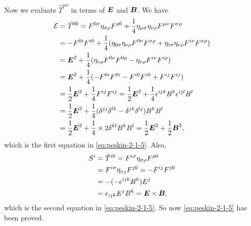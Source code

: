 \documentclass[hyperref, a4paper]{article}
\begin{document}
\begin{itemize}
    Now we evaluate $\hat{T}^{\mu \nu}$ in terms of $\vb*{E}$ and $\vb*{B}$.
    We have
    \[
        \begin{aligned}
            \mathcal{E} &= \hat{T}^{00} = F^{0 \sigma} \eta_{\sigma \rho} F^{\rho 0} + \frac{1}{4} \eta_{\mu \sigma} \eta_{\nu \rho} F^{\mu \nu} F^{\sigma \rho} \\
            &= - F^{0 i} F^{i 0} + \frac{1}{4} (\eta_{0 \sigma} \eta_{\nu \rho} F^{0 \nu} F^{\sigma \rho} + \eta_{i \sigma} \eta_{\nu \rho} F^{i \nu} F^{\sigma \rho}) \\
            &= \vb*{E}^2 + \frac{1}{4} ( \eta_{\nu \rho} F^{0 \nu} F^{0 \rho} - \eta_{\nu \rho} F^{i \nu} F^{i \rho}) \\
            &= \vb*{E}^2 + \frac{1}{4} ( - F^{0 i} F^{0 i} - F^{i 0} F^{i 0} + F^{i j} F^{i j}) \\
            &= \frac{1}{2} \vb*{E}^2 + \frac{1}{4} F^{ij} F^{ij} = \frac{1}{2} \vb*{E}^2 + \frac{1}{4} \epsilon^{ijk} B^k \epsilon^{ijl} B^l \\
            &= \frac{1}{2} \vb*{E}^2 + \frac{1}{4} (\delta^{jj} \delta^{lk} - \delta^{jk} \delta^{lj}) B^k B^l \\
            &= \frac{1}{2} \vb*{E}^2 + \frac{1}{4} \times 2 \delta^{kl} B^k B^l = \frac{1}{2} \vb*{E}^2 + \frac{1}{2} \vb*{B}^2,
        \end{aligned}
    \]
    which is the first equation in \eqref{eq:peskin-2-1-5}.
    Also, 
    \[
        \begin{aligned}
            S^i &= \hat{T}^{i 0} = F^{i \sigma} \eta_{\sigma \rho} F^{\rho 0} \\
            &= F^{i \sigma} \eta_{\sigma j} F^{j 0} = - F^{i j} F^{j 0} \\
            &= - (- \epsilon^{ijk} B^k) E^j \\
            &= \epsilon_{ijk} E^j B^k = \vb*{E} \times \vb*{B},
        \end{aligned}
    \]
    which is the second equation in \eqref{eq:peskin-2-1-5}.
    So now \eqref{eq:peskin-2-1-5} has been proved.
\end{itemize}
\end{document}
